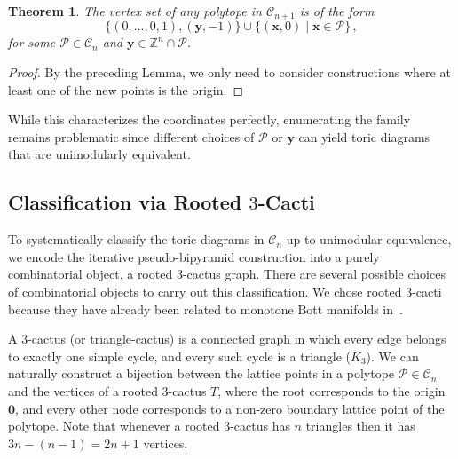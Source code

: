 \documentclass[a4paper,11pt,reqno]{amsart}
\newtheorem{theorem}{Theorem}[section]
\begin{document}
\begin{theorem} \label{thm:pbipyr}
The vertex set of any polytope in $\mathcal{C}_{n+1}$ is of the form
\[
\{(0,...,0, 1), (\bm{y}, -1) \} \cup \{ (\bm{x}, 0) \mid \bm{x} \in \mathcal{P} \}\,,
\]
for some $\mathcal{P} \in \mathcal{C}_{n}$ and $\bm{y} \in \mathbb{Z}^n \cap \mathcal{P}$.
\end{theorem}
\begin{proof}
By the preceding Lemma, we only need to consider constructions where at least one of the new points is the origin.
\end{proof}
\noindent While this characterizes the coordinates perfectly, enumerating the family remains problematic since 
different choices of $\mathcal{P}$ or $\bm{y}$ can yield toric diagrams that are unimodularly equivalent.

\subsection{Classification via Rooted $3$-Cacti}

To systematically classify the toric diagrams in $\mathcal{C}_n$ up to unimodular equivalence, we encode the 
iterative pseudo-bipyramid construction into a purely combinatorial object, a rooted $3$-cactus graph. There 
are several possible choices of  combinatorial objects to carry out this classification. We chose rooted $3$-cacti 
because they have already been related to monotone Bott manifolds in~\cite{CLMP-2}.

A $3$-cactus (or triangle-cactus) is a connected graph in which every edge belongs to exactly one simple cycle, 
and every such cycle is a triangle ($K_3$). We can naturally construct a bijection between the lattice points in 
a polytope $\mathcal{P} \in \mathcal{C}_n$ and the vertices of a rooted $3$-cactus $T$, where the root 
corresponds to the origin $\bm{0}$, and every other node corresponds to a non-zero boundary lattice point of 
the polytope. Note that whenever a rooted $3$-cactus has $n$ triangles then it has $3n-(n-1)=2n+1$ vertices.
\end{document}
